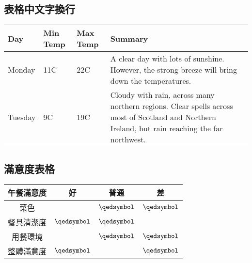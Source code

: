 \subsection{表格中文字換行}
\begin{center}
\begin{tabular}{ | l | l | l | p{5cm} |}
\hline
Day & Min Temp & Max Temp & Summary \\ \hline
Monday & 11C & 22C & A clear day with lots of sunshine. However, the strong breeze will bring down the temperatures. \\ \hline
Tuesday & 9C & 19C & Cloudy with rain, across many northern regions. Clear spells across most of Scotland and Northern Ireland, but rain reaching the far northwest. \\ \hline
\end{tabular}
\end{center}
\subsection{滿意度表格}
\begin{center}
\begin{tabular}{>{
\columncolor{grannysmithapple}}cccc}
\rowcolor[gray]{.85}
\hline
午餐滿意度 & 好 & 普通 & 差 \\
\hline
菜色      & \mbox{\ooalign{$\checkmark$\cr\hidewidth$\square$\hidewidth\cr}} & $\qedsymbol$ & $\qedsymbol$ \\
餐具清潔度 & $\qedsymbol$ & $\qedsymbol$ & \mbox{\ooalign{$\checkmark$\cr\hidewidth$\square$\hidewidth\cr}} \\
用餐環境   & \mbox{\ooalign{$\checkmark$\cr\hidewidth$\square$\hidewidth\cr}} & $\qedsymbol$ & $\qedsymbol$ \\
整體滿意度 & $\qedsymbol$ & \mbox{\ooalign{$\checkmark$\cr\hidewidth$\square$\hidewidth\cr}} & $\qedsymbol$ \\
\hline 
\end{tabular}
\end{center}
